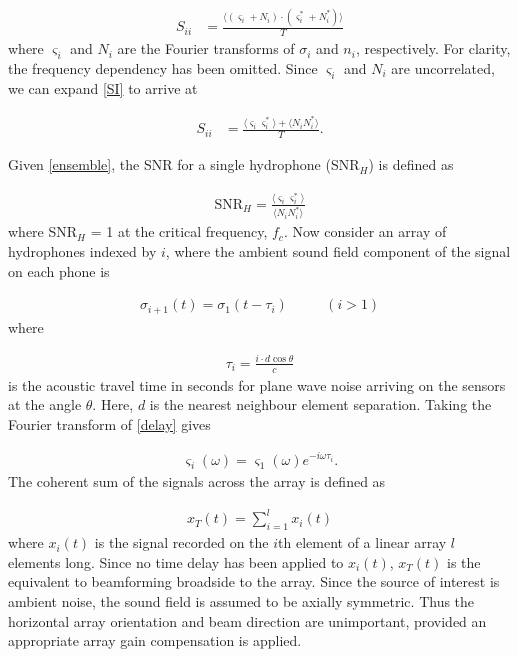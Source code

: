 \documentclass[12pt,journal,onecolumn]{IEEEtran}
\begin{document}
\begin{align}
S_{ii} &= \frac{\langle (\varsigma_i + N_i)\cdot(\varsigma^*_i + N^*_i) \rangle}{T}
\label{SI}
\end{align}
where $\varsigma_i$ and $N_i$ are the Fourier transforms of $\sigma_i$ and $n_i$, respectively. For clarity, the frequency dependency has been omitted. Since $\varsigma_i$ and $N_i$ are uncorrelated, we can expand \eqref{SI} to arrive at

\begin{align}
S_{ii} &= \frac{\langle \varsigma_i \varsigma^*_i \rangle + \langle N_i N^*_i \rangle}{T}.
\label{ensemble}
\end{align}

Given \eqref{ensemble}, the SNR for a single hydrophone (SNR$_H$) is defined as	

\begin{align}
\text{SNR}_H = \frac{\langle \varsigma_i \varsigma^*_i \rangle}{\langle N_i N^*_i \rangle}
\label{SNR}
\end{align}
where SNR$_H$ = 1 at the critical frequency, $f_c$. Now consider an array of hydrophones indexed by $i$, where the ambient sound field component of the signal on each phone is

\begin{align}
\sigma_{i+1}(t) = \sigma_1(t-\tau_{i}) \quad \quad \text{ } (i>1)
\label{delay}
\end{align}
where 

\begin{align}
\tau_i = \frac{i\cdot d \cos\theta}{c}
\label{tau}
\end{align}
is the acoustic travel time in seconds for plane wave noise arriving on the sensors at the angle $\theta$. Here, $d$ is the nearest neighbour element separation.  Taking the Fourier transform of \eqref{delay} gives 

\begin{align}
\varsigma_i(\omega) = \varsigma_1(\omega) e^{-i \omega \tau_{i}}.
\label{array_power}
\end{align}
The coherent sum of the signals across the array is defined as 

\begin{align}
x_T(t) = \sum_{i = 1}^{l} x_i(t)
\label{xt}
\end{align}
where $x_i(t)$ is the signal recorded on the $i$th element of a linear array $l$ elements long. Since no time delay has been applied to $x_i(t)$, $x_T(t)$ is the equivalent to beamforming broadside to the array. Since the source of interest is ambient noise, the sound field is assumed to be axially symmetric. Thus the horizontal array orientation and beam direction are unimportant, provided an appropriate array gain compensation is applied. 
\end{document}
